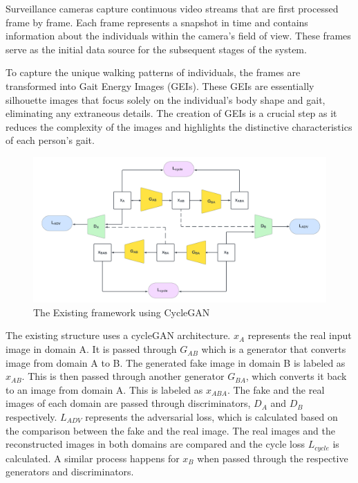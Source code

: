\documentclass[12pt,a4paper]{article}
\begin{document}
Surveillance cameras capture continuous video streams that are first processed frame by frame. Each frame represents a snapshot in time and contains information about the individuals within the camera's field of view. These frames serve as the initial data source for the subsequent stages of the system.

To capture the unique walking patterns of individuals, the frames are transformed into Gait Energy Images (GEIs). These GEIs are essentially silhouette images that focus solely on the individual's body shape and gait, eliminating any extraneous details. The creation of GEIs is a crucial step as it reduces the complexity of the images and highlights the distinctive characteristics of each person's gait.

\begin{figure}[!h]
  \centering
\includegraphics[scale=0.4]{images/color-cc.png}
  \caption{The Existing framework using CycleGAN}
  \label{fig:Overall}
\end{figure}

The existing structure uses a cycleGAN architecture. $x_A$ represents the real input image in domain A. It is passed through $G_{AB}$ which is a generator that converts image from domain A to B. The generated fake image in domain B is labeled as $x_{AB}$. This is then passed through another generator $G_{BA}$, which converts it back to an image from domain A.
This is labeled as $x_{ABA}$. The fake and the real images of each domain are passed through discriminators, $D_A$ and $D_B$ respectively. $L_{ADV}$ represents the adversarial loss, which is calculated based on the comparison between the fake and the real image. The real images and the reconstructed images in both domains are compared and the cycle loss $L_{cycle}$ is calculated. A similar process happens for $x_B$ when passed through the respective generators and discriminators.
\newline
\end{document}
